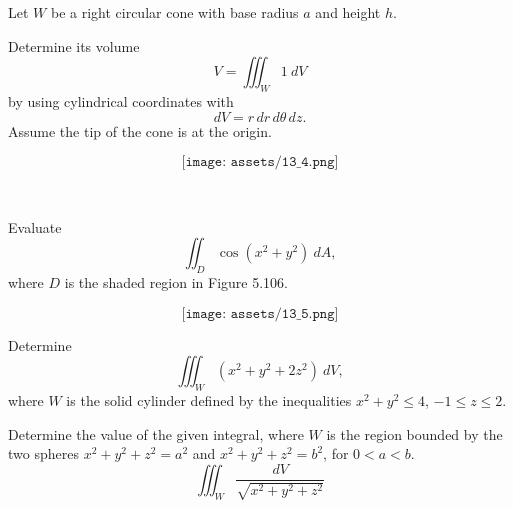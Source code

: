 \documentclass[12pt,letterpaper]{hmcpset}
\begin{document}
\begin{problem}[5] Let $W$ be a right circular cone with base radius $a$ and height $h$. \\
\parbox{0.475\textwidth}{Determine its volume
\[ V = \iiint_{W} 1 \ dV  \]
by using cylindrical coordinates 
with  
\[ dV = r \, dr \, d\theta \, dz. \]
 Assume the tip of the cone is at the origin.
\vspace{0.65in}
} \parbox{0.5\textwidth}{
\[ \texttt{[image: assets/13\_4.png]} \] 
}
\end{problem}
\clearpage

\begin{problem}[Colley 5.5.25] \\
  \parbox{0.4\textwidth}{
    Evaluate
  \[ \iint_D \cos \left( x^2 + y^2 \right)~dA, \]
  where $D$ is the shaded region in Figure 5.106.
}
\parbox{0.6\textwidth}{
  \[ \texttt{[image: assets/13\_5.png]}\]
  }
\end{problem}
\clearpage

\begin{problem}[Colley 5.5.31]
  Determine
  \[ \iiint_W \left( x^2 + y^2 + 2z^2 \right)~dV,\]
  where $W$ is the solid cylinder defined by the inequalities $x^2 + y^2 \leq 4$, $-1 \leq z \leq 2$.
\end{problem}
\clearpage

\begin{problem}[Colley 5.5.34]
  Determine the value of the given integral, where $W$ is the region bounded by the two spheres $x^2 + y^2 + z^2 = a^2$ and $x^2 + y^2 + z^2 = b^2$, for $0 < a < b$.
  \[ \iiint_W \frac{dV}{\sqrt{x^2 + y^2 + z^2}}\]
\end{problem}
\clearpage
\end{document}
